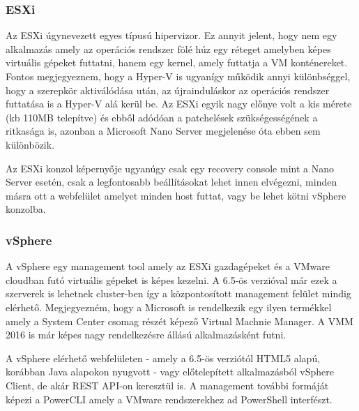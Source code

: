 \documentclass[12pt,oneside,justify,table]{book}
\begin{document}
\subsubsection{ESXi}
Az ESXi úgynevezett egyes típusú hipervizor. Ez annyit jelent, hogy nem egy alkalmazás amely az operációs rendszer fölé húz egy réteget amelyben képes virtuális gépeket futtatni, hanem egy kernel, amely futtatja a VM konténereket. Fontos megjegyeznem, hogy a Hyper-V is ugyanígy működik annyi különbséggel, hogy a szerepkör aktiválódása után, az újrainduláskor az operációs rendszer futtatása is a Hyper-V alá kerül be. Az ESXi egyik nagy előnye volt a kis mérete (kb 110MB telepítve) és ebből adódóan a patchelések szükségességének a ritkasága is, azonban a Microsoft Nano Server megjelenése óta ebben sem különbözik. 

Az ESXi konzol képernyője ugyanúgy csak egy recovery console mint a Nano Server esetén, csak a legfontosabb beállításokat lehet innen elvégezni, minden másra ott a webfelület amelyet minden host futtat, vagy be lehet kötni vSphere konzolba. \\

\subsubsection{vSphere} 
A vSphere egy management tool amely az ESXi gazdagépeket és a VMware cloudban futó virtuális gépeket is képes kezelni. A 6.5-ös verzióval már ezek a szerverek is lehetnek cluster-ben így a központosított management felület mindig elérhető. Megjegyezném, hogy a Microsoft is rendelkezik egy ilyen termékkel amely a System Center csomag részét képező Virtual Machnie Manager. A VMM 2016 is már képes nagy rendelkezésre állású alkalmazásként futni. 

A vSphere elérhető webfelületen - amely a 6.5-ös verziótól HTML5 alapú, korábban Java alapokon nyugvott - vagy előtelepített alkalmazásból vSphere Client, de akár REST API-on keresztül is. A management további formáját képezi a PowerCLI amely a VMware rendszerekhez ad PowerShell interfészt.
\end{document}

